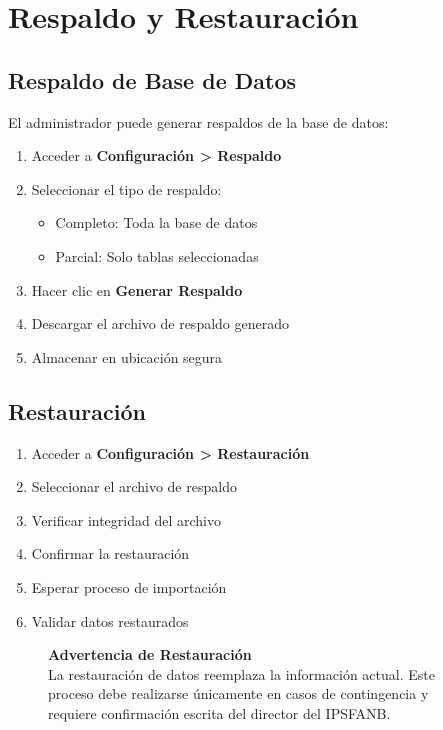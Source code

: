 \section{Respaldo y Restauración}

\subsection*{Respaldo de Base de Datos}

El administrador puede generar respaldos de la base de datos:

\begin{enumerate}[leftmargin=*]
    \item Acceder a \textbf{Configuración > Respaldo}
    \item Seleccionar el tipo de respaldo:
    \begin{itemize}
        \item Completo: Toda la base de datos
        \item Parcial: Solo tablas seleccionadas
    \end{itemize}
    \item Hacer clic en \textbf{Generar Respaldo}
    \item Descargar el archivo de respaldo generado
    \item Almacenar en ubicación segura
\end{enumerate}

\subsection*{Restauración}

\begin{enumerate}[leftmargin=*]
    \item Acceder a \textbf{Configuración > Restauración}
    \item Seleccionar el archivo de respaldo
    \item Verificar integridad del archivo
    \item Confirmar la restauración
    \item Esperar proceso de importación
    \item Validar datos restaurados
\end{enumerate}

\begin{figure}[H]
\centering
\begin{tcolorbox}[
    enhanced,
    colback=sandraSoft,
    colframe=sandraAccent,
    width=0.9\textwidth,
    halign=center
]
\small
\textbf{Advertencia de Restauración}\\
\smallskip
La restauración de datos reemplaza la información actual. Este proceso debe realizarse únicamente en casos de contingencia y requiere confirmación escrita del director del IPSFANB.
\end{tcolorbox}
\end{figure}

